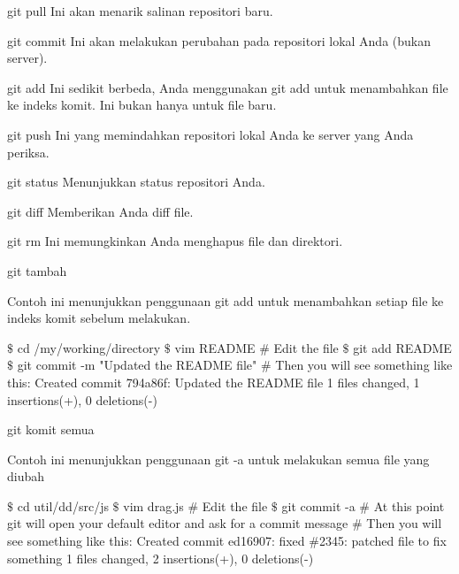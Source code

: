 \noindent 
git pull $  $Ini akan menarik salinan repositori baru. \par
\vspace{12pt}
\noindent 
git commit $  $Ini akan melakukan perubahan pada repositori lokal Anda (bukan server). \par
\vspace{12pt}
\noindent 
git add $  $Ini sedikit berbeda, Anda menggunakan git add untuk menambahkan file ke indeks komit. $  $Ini bukan hanya untuk file baru. \par
\vspace{12pt}
\noindent 
git push $  $Ini yang memindahkan repositori lokal Anda ke server yang Anda periksa. \par
\vspace{12pt}
\noindent 
git status $  $Menunjukkan status repositori Anda. \par
\vspace{12pt}
\noindent 
git diff $  $Memberikan Anda diff file. \par
\vspace{12pt}
\noindent 
git rm $  $Ini memungkinkan Anda menghapus file dan direktori. \par
\vspace{12pt}
\noindent 
 $  $git tambah \par
\vspace{12pt}
\noindent 
Contoh ini menunjukkan penggunaan git add untuk menambahkan setiap file ke indeks komit sebelum melakukan. \par
\vspace{12pt}
\noindent 
  $  \$  $ cd /my/working/directory  $  \$  $ vim README  $  \#  $ Edit the file  $  \$  $ git add README  $  \$  $ git commit -m "Updated the README file"  $  \#  $ Then you will see something like this: Created commit 794a86f: Updated the README file 1 files changed, 1 insertions(+), 0 deletions(-)  \par
\vspace{12pt}
\noindent 
 $  $git komit semua \par
\vspace{12pt}
\noindent 
Contoh ini menunjukkan penggunaan $  $git -a $  $untuk melakukan semua file yang diubah \par
\noindent 
  $  \$  $ cd util/dd/src/js  $  \$  $ vim drag.js  $  \#  $ Edit the file  $  \$  $ git commit -a  $  \#  $ At this point git will open your default editor and ask for a commit message  $  \#  $ Then you will see something like this: Created commit ed16907: fixed  $  \#  $2345: patched file to fix something 1 files changed, 2 insertions(+), 0 deletions(-)  \par
